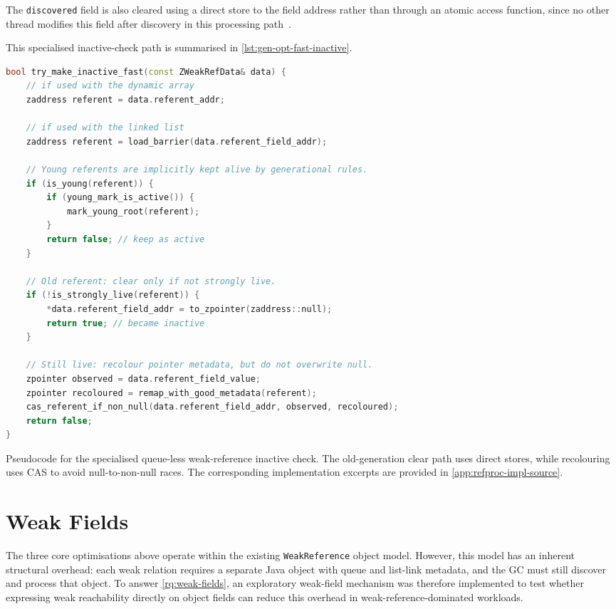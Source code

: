 The \texttt{discovered} field is also cleared using a direct store to the field address rather than through an atomic access function, since no other thread modifies this field after discovery in this processing path~\cite{openjdk-zreferenceprocessor-cpp}.

This specialised inactive-check path is summarised in \cref{lst:gen-opt-fast-inactive}.

\begin{listing}[htbp]
\begin{lstlisting}[language=C++]
bool try_make_inactive_fast(const ZWeakRefData& data) {
    // if used with the dynamic array
    zaddress referent = data.referent_addr;

    // if used with the linked list
    zaddress referent = load_barrier(data.referent_field_addr);

    // Young referents are implicitly kept alive by generational rules.
    if (is_young(referent)) {
        if (young_mark_is_active()) {
            mark_young_root(referent);
        }
        return false; // keep as active
    }

    // Old referent: clear only if not strongly live.
    if (!is_strongly_live(referent)) {
        *data.referent_field_addr = to_zpointer(zaddress::null);
        return true; // became inactive
    }

    // Still live: recolour pointer metadata, but do not overwrite null.
    zpointer observed = data.referent_field_value;
    zpointer recoloured = remap_with_good_metadata(referent);
    cas_referent_if_non_null(data.referent_field_addr, observed, recoloured);
    return false;
}
\end{lstlisting}
\caption[Optimised-clear-path fast inactive check]{Pseudocode for the specialised queue-less weak-reference inactive check. The old-generation clear path uses direct stores, while recolouring uses CAS to avoid null-to-non-null races. The corresponding implementation excerpts are provided in \cref{app:refproc-impl-source}.}
\label{lst:gen-opt-fast-inactive}
\end{listing}

\section{Weak Fields}
\label{sec:weak-fields-method}

The three core optimisations above operate within the existing \texttt{WeakReference} object model. However, this model has an inherent structural overhead: each weak relation requires a separate Java object with queue and list-link metadata, and the GC must still discover and process that object. To answer \cref{rq:weak-fields}, an exploratory weak-field mechanism was therefore implemented to test whether expressing weak reachability directly on object fields can reduce this overhead in weak-reference-dominated workloads.

